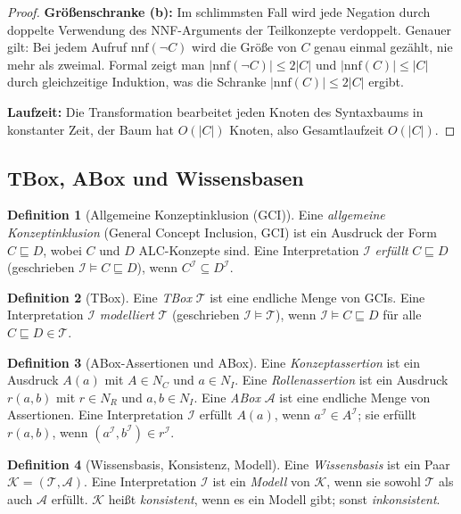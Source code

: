 ﻿\documentclass[a4paper,12pt]{article}
\theoremstyle{definition}
\newtheorem{definition}{Definition}[section]
\theoremstyle{plain}
\theoremstyle{remark}
\newcommand{\Tbox}{\ensuremath{\mathcal{T}}}
\newcommand{\Abox}{\ensuremath{\mathcal{A}}}
\newcommand{\KB}{\ensuremath{\mathcal{K}}}
\newcommand{\interp}[1]{\ensuremath{\mathcal{#1}}}
\begin{document}
\begin{proof}
\textbf{Gr{\"{o}}{\ss}enschranke (b):}
Im schlimmsten Fall wird jede Negation durch doppelte Verwendung
des NNF-Arguments der Teilkonzepte verdoppelt.
Genauer gilt: Bei jedem Aufruf $\mathrm{nnf}(\neg C)$ wird
die Gr{\"{o}}{\ss}e von $C$ genau einmal gez{\"{a}}hlt, nie mehr als zweimal.
Formal zeigt man $|\mathrm{nnf}(\neg C)| \leq 2|C|$
und $|\mathrm{nnf}(C)| \leq |C|$ durch gleichzeitige Induktion,
was die Schranke $|\mathrm{nnf}(C)| \leq 2|C|$ ergibt.

\textbf{Laufzeit:}
Die Transformation bearbeitet jeden Knoten des Syntaxbaums
in konstanter Zeit, der Baum hat $O(|C|)$ Knoten,
also Gesamtlaufzeit $O(|C|)$.
\qedhere
\end{proof}

\subsection{TBox, ABox und Wissensbasen}

\begin{definition}[Allgemeine Konzeptinklusion (GCI)]
Eine \emph{allgemeine Konzeptinklusion} (General Concept Inclusion, GCI)
ist ein Ausdruck der Form $C \sqsubseteq D$, wobei $C$ und $D$
\textsf{ALC}-Konzepte sind.
Eine Interpretation $\interp{I}$ \emph{erf{\"{u}}llt} $C \sqsubseteq D$
(geschrieben $\interp{I} \models C \sqsubseteq D$), wenn
$C^\interp{I} \subseteq D^\interp{I}$.
\end{definition}

\begin{definition}[TBox]
Eine \emph{TBox} $\Tbox$ ist eine endliche Menge von GCIs.
Eine Interpretation $\interp{I}$ \emph{modelliert} $\Tbox$
(geschrieben $\interp{I} \models \Tbox$), wenn
$\interp{I} \models C \sqsubseteq D$ f{\"{u}}r alle
$C \sqsubseteq D \in \Tbox$.
\end{definition}

\begin{definition}[ABox-Assertionen und ABox]
Eine \emph{Konzeptassertion} ist ein Ausdruck $A(a)$
mit $A \in N_C$ und $a \in N_I$.
Eine \emph{Rollenassertion} ist ein Ausdruck $r(a,b)$
mit $r \in N_R$ und $a, b \in N_I$.
Eine \emph{ABox} $\Abox$ ist eine endliche Menge von Assertionen.
Eine Interpretation $\interp{I}$ erf{\"{u}}llt $A(a)$, wenn
$a^\interp{I} \in A^\interp{I}$; sie erf{\"{u}}llt $r(a,b)$, wenn
$(a^\interp{I}, b^\interp{I}) \in r^\interp{I}$.
\end{definition}

\begin{definition}[Wissensbasis, Konsistenz, Modell]
Eine \emph{Wissensbasis} ist ein Paar $\KB = (\Tbox, \Abox)$.
Eine Interpretation $\interp{I}$ ist ein \emph{Modell} von $\KB$,
wenn sie sowohl $\Tbox$ als auch $\Abox$ erf{\"{u}}llt.
$\KB$ hei{\ss}t \emph{konsistent}, wenn es ein Modell gibt;
sonst \emph{inkonsistent}.
\end{definition}
\end{document}
